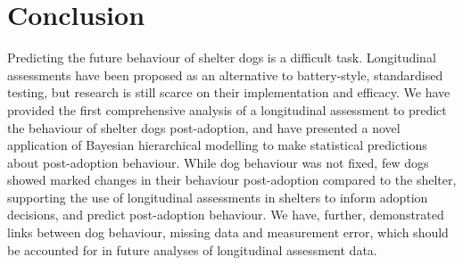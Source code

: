 \documentclass[12pt]{article}
\begin{document}
\section{Conclusion}
Predicting the future behaviour of shelter dogs is a difficult task. Longitudinal assessments have been proposed as an alternative to battery-style, standardised testing, but research is still scarce on their implementation and efficacy. We have provided the first comprehensive analysis of a longitudinal assessment to predict the behaviour of shelter dogs post-adoption, and have presented a novel application of Bayesian hierarchical modelling to make statistical predictions about post-adoption behaviour. While dog behaviour was not fixed, few dogs showed marked changes in their behaviour post-adoption compared to the shelter, supporting the use of longitudinal assessments in shelters to inform adoption decisions, and predict post-adoption behaviour. We have, further, demonstrated links between dog behaviour, missing data and measurement error, which should be accounted for in future analyses of longitudinal assessment data.


\newpage
\printbibliography
\end{document}
